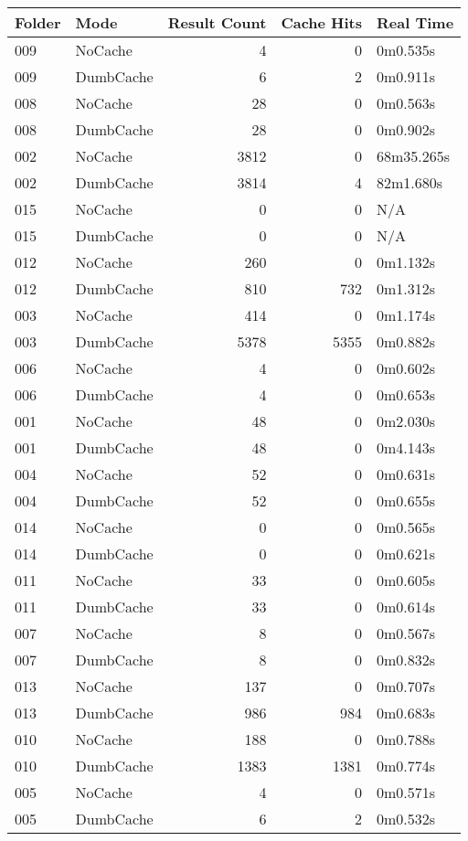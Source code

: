 \begin{tabular}{llrrl}
\toprule
Folder & Mode & Result Count & Cache Hits & Real Time \\
\midrule
009 & NoCache & 4 & 0 & 0m0.535s \\
009 & DumbCache & 6 & 2 & 0m0.911s \\
008 & NoCache & 28 & 0 & 0m0.563s \\
008 & DumbCache & 28 & 0 & 0m0.902s \\
002 & NoCache & 3812 & 0 & 68m35.265s \\
002 & DumbCache & 3814 & 4 & 82m1.680s \\
015 & NoCache & 0 & 0 & N/A \\
015 & DumbCache & 0 & 0 & N/A \\
012 & NoCache & 260 & 0 & 0m1.132s \\
012 & DumbCache & 810 & 732 & 0m1.312s \\
003 & NoCache & 414 & 0 & 0m1.174s \\
003 & DumbCache & 5378 & 5355 & 0m0.882s \\
006 & NoCache & 4 & 0 & 0m0.602s \\
006 & DumbCache & 4 & 0 & 0m0.653s \\
001 & NoCache & 48 & 0 & 0m2.030s \\
001 & DumbCache & 48 & 0 & 0m4.143s \\
004 & NoCache & 52 & 0 & 0m0.631s \\
004 & DumbCache & 52 & 0 & 0m0.655s \\
014 & NoCache & 0 & 0 & 0m0.565s \\
014 & DumbCache & 0 & 0 & 0m0.621s \\
011 & NoCache & 33 & 0 & 0m0.605s \\
011 & DumbCache & 33 & 0 & 0m0.614s \\
007 & NoCache & 8 & 0 & 0m0.567s \\
007 & DumbCache & 8 & 0 & 0m0.832s \\
013 & NoCache & 137 & 0 & 0m0.707s \\
013 & DumbCache & 986 & 984 & 0m0.683s \\
010 & NoCache & 188 & 0 & 0m0.788s \\
010 & DumbCache & 1383 & 1381 & 0m0.774s \\
005 & NoCache & 4 & 0 & 0m0.571s \\
005 & DumbCache & 6 & 2 & 0m0.532s \\
\bottomrule
\end{tabular}
